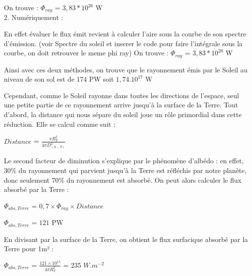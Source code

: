 \documentclass[a4paper, 12pt]{report} %
\begin{document}
\noindent On trouve :
$\Phi_{ray}$ = $3,83*10^{26}$ W  \\

2. Numériquement : \vspace{\baselineskip}

En effet évaluer le flux émit revient à calculer l'aire sous la courbe de son spectre d'émission. (voir Spectre du soleil et inserer 
le code pour faire l'intégrale sous la courbe, on doit retrouver le meme phi ray) \vspace{\baselineskip}
\newline On trouve :
$\Phi_{ray}$ = $3,83*10^{26}$ W \vspace{\baselineskip}

Ainsi avec ces deux méthodes, on trouve que le rayonnement émis par le Soleil au niveau de son sol
est de 174 PW  soit $1,74.10^{17}$ W \vspace{\baselineskip}
\vspace{\baselineskip}
\vspace{\baselineskip}


Cependant, comme le Soleil rayonne dans toutes les directions de l’espace, seul une petite partie de ce rayonnement arrive jusqu’à la surface de la Terre. 
Tout d’abord, la distance qui nous sépare du soleil joue un rôle primordial dans cette réduction. 
\newline Elle se calcul comme suit :
\begin{center}
$Distance$ = $\frac{\pi R_T^{2}}{4 \pi D_{(S-T)}^{2}}$    
\end{center}

Le second facteur de diminution s’explique par le phénomène d’albédo : en effet, 30\% du rayonnement qui parvient jusqu’à la Terre est réfléchis par notre planète, donc seulement 70\% du rayonnement est absorbé. 
\newline On peut alors calculer le flux absorbé par la Terre : 
\begin{center}
$\Phi_{abs,Terre}$ = $0,7 \times \Phi_{ray} \times Distance$    
\end{center}
\begin{center}
$\Phi_{abs,Terre}$ = $121$ PW    
\end{center}

En divisant par la surface de la Terre, 
on obtient le flux surfacique absorbé par la Terre pour 1m² :
\begin{center}
$\Phi_{abs,Terre}$ = $\frac {121 \times 10^{15}}{4 \pi R_T^{2}}$
= 235 $W.m^{-2}$
\end{center}
\end{document}
